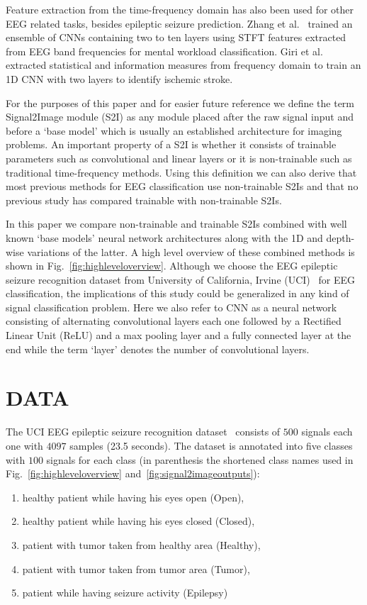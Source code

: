 \documentclass[conference]{IEEEtran}
\begin{document}
Feature extraction from the time-frequency domain has also been used
for other EEG related tasks, besides epileptic seizure prediction.
Zhang et al.~\cite{zhang2017pattern} trained an ensemble of CNNs
containing two to ten layers using STFT features extracted from EEG
band frequencies for mental workload classification.
Giri et al.~\cite{giri2016ischemic} extracted statistical and
information measures from frequency domain to train an 1D CNN with
two layers to identify ischemic stroke.

For the purposes of this paper and for easier future reference we
define the term Signal2Image module (S2I) as any module placed after
the raw signal input and before a `base model' which is usually an
established architecture for imaging problems.
An important property of a S2I is whether it consists of trainable
parameters such as convolutional and linear layers or it is
non-trainable such as traditional time-frequency methods.
Using this definition we can also derive that most previous methods
for EEG classification use non-trainable S2Is and that no previous
study has compared trainable with non-trainable S2Is.

In this paper we compare non-trainable and trainable S2Is combined
with well known `base models' neural network architectures along with
the 1D and depth-wise variations of the latter.
A high level overview of these combined methods is shown in
Fig.~\ref{fig:highleveloverview}.
Although we choose the EEG epileptic seizure recognition dataset from
University of California, Irvine
(UCI)~\cite{andrzejak2001indications} for EEG classification, the
implications of this study could be generalized in any kind of signal
classification problem.
Here we also refer to CNN as a neural network consisting of
alternating convolutional layers each one followed by a Rectified
Linear Unit (ReLU) and a max pooling layer and a fully connected
layer at the end while the term `layer' denotes the number of
convolutional layers.

\section{DATA}
The UCI EEG epileptic seizure recognition
dataset~\cite{andrzejak2001indications} consists of $500$ signals
each one with $4097$ samples (23.5 seconds).
The dataset is annotated into five classes with $100$ signals for
each class (in parenthesis the shortened class names used in
Fig.~\ref{fig:highleveloverview} and~\ref{fig:signal2imageoutputs}):
\begin{enumerate}
  \item healthy patient while having his eyes open (Open),
  \item healthy patient while having his eyes closed (Closed),
  \item patient with tumor taken from healthy area (Healthy),
  \item patient with tumor taken from tumor area (Tumor),
  \item patient while having seizure activity (Epilepsy)
\end{enumerate}
\end{document}
